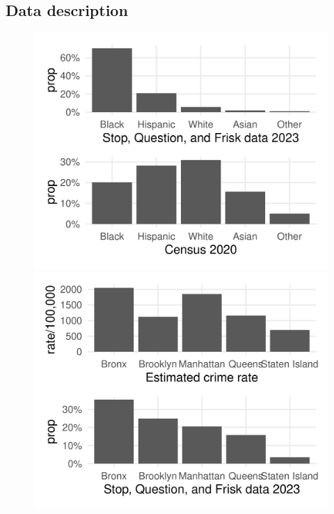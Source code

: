 
\subsection{Data description}
\begin{figure}
  \centering
  \begin{minipage}{0.49\textwidth}
      \centering
      \includegraphics[width=\textwidth]{../figures/sqf_case_study_plot6.pdf}
  \end{minipage}
  \hfill
  \begin{minipage}{0.49\textwidth}
      \centering
      \includegraphics[width=\textwidth]{../figures/sqf_case_study_plot14.pdf}

\end{minipage}
\end{figure}
